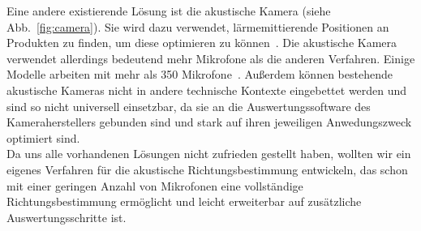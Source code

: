 Eine andere existierende Lösung ist die akustische Kamera (siehe Abb.~\ref{fig:camera}). Sie wird dazu verwendet, lärmemittierende Positionen an Produkten zu finden, um diese optimieren zu können~\cite{camera}. Die akustische Kamera verwendet allerdings bedeutend mehr Mikrofone als die anderen Verfahren. Einige Modelle arbeiten mit mehr als \num{350} Mikrofone~\cite{nmics}. Außerdem können bestehende akustische Kameras nicht in andere technische Kontexte eingebettet werden und sind so nicht universell einsetzbar, da sie an die Auswertungssoftware des Kameraherstellers gebunden sind und stark auf ihren jeweiligen Anwedungszweck optimiert sind.\\
Da uns alle vorhandenen Lösungen nicht zufrieden gestellt haben, wollten wir ein eigenes Verfahren für die akustische Richtungsbestimmung entwickeln, das schon mit einer geringen Anzahl von Mikrofonen eine vollständige Richtungsbestimmung ermöglicht und leicht erweiterbar auf zusätzliche Auswertungsschritte ist.
